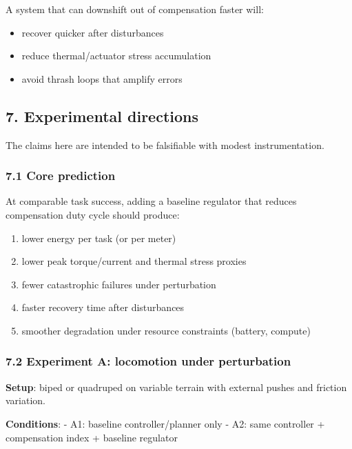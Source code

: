 \documentclass[11pt]{article}
\providecommand{\tightlist}{%
  \setlength{\itemsep}{0pt}\setlength{\parskip}{0pt}}
\begin{document}
A system that can downshift out of compensation faster will:

\begin{itemize}
\tightlist
\item
  recover quicker after disturbances
\item
  reduce thermal/actuator stress accumulation
\item
  avoid thrash loops that amplify errors
\end{itemize}

\hypertarget{experimental-directions}{%
\subsection{7. Experimental directions}\label{experimental-directions}}

The claims here are intended to be falsifiable with modest instrumentation.

\hypertarget{core-prediction}{%
\subsubsection{7.1 Core prediction}\label{core-prediction}}

At comparable task success, adding a baseline regulator that reduces compensation duty cycle should produce:

\begin{enumerate}
\def\labelenumi{\arabic{enumi})}
\tightlist
\item
  lower energy per task (or per meter)
\item
  lower peak torque/current and thermal stress proxies
\item
  fewer catastrophic failures under perturbation
\item
  faster recovery time after disturbances
\item
  smoother degradation under resource constraints (battery, compute)
\end{enumerate}

\hypertarget{experiment-a-locomotion-under-perturbation}{%
\subsubsection{7.2 Experiment A: locomotion under perturbation}\label{experiment-a-locomotion-under-perturbation}}

\textbf{Setup}: biped or quadruped on variable terrain with external pushes and friction variation.

\textbf{Conditions}: - A1: baseline controller/planner only - A2: same controller + compensation index + baseline regulator
\end{document}
